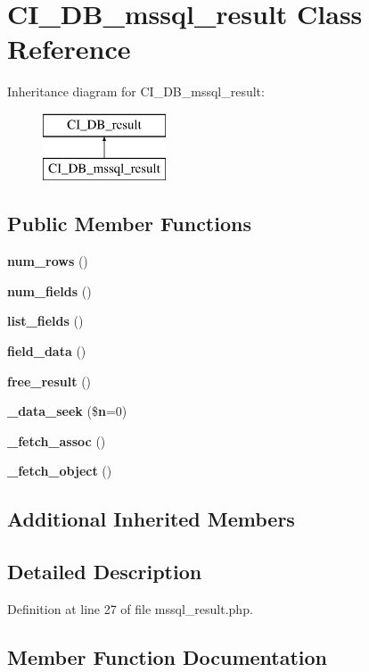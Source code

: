 \section{C\-I\-\_\-\-D\-B\-\_\-mssql\-\_\-result Class Reference}
\label{class_c_i___d_b__mssql__result}
Inheritance diagram for C\-I\-\_\-\-D\-B\-\_\-mssql\-\_\-result\-:\begin{figure}[H]
\begin{center}
\leavevmode
\includegraphics[height=2.000000cm]{class_c_i___d_b__mssql__result}
\end{center}
\end{figure}
\subsection*{Public Member Functions}
\begin{DoxyCompactItemize}
\item 
{\bf num\-\_\-rows} ()
\item 
{\bf num\-\_\-fields} ()
\item 
{\bf list\-\_\-fields} ()
\item 
{\bf field\-\_\-data} ()
\item 
{\bf free\-\_\-result} ()
\item 
{\bf \-\_\-data\-\_\-seek} (\${\bf n}=0)
\item 
{\bf \-\_\-fetch\-\_\-assoc} ()
\item 
{\bf \-\_\-fetch\-\_\-object} ()
\end{DoxyCompactItemize}
\subsection*{Additional Inherited Members}


\subsection{Detailed Description}


Definition at line 27 of file mssql\-\_\-result.\-php.



\subsection{Member Function Documentation}
